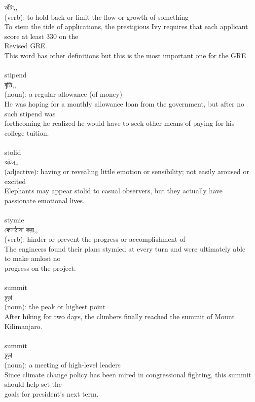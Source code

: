 \documentclass{article}
\begin{document}
{ডাঁটা,,}\\
{(verb): to hold back or limit the flow or growth of something\\To stem the tide of applications, the prestigious Ivy requires that each applicant score at least 330 on the\\Revised GRE.\\This word has other definitions but this is the most important one for the GRE\\}\\
{stipend}\\
{বৃত্তি,,}\\
{(noun): a regular allowance (of money)\\He was hoping for a monthly allowance loan from the government, but after no such stipend was\\forthcoming he realized he would have to seek other means of paying for his college tuition.\\}\\
{stolid}\\
{অটল,,}\\
{(adjective): having or revealing little emotion or sensibility; not easily aroused or excited\\Elephants may appear stolid to casual observers, but they actually have passionate emotional lives.\\}\\
{stymie}\\
{কোণঠাসা করা,,}\\
{(verb): hinder or prevent the progress or accomplishment of\\The engineers found their plans stymied at every turn and were ultimately able to make amlost no\\progress on the project.\\}\\
{summit}\\
{চূড়া}\\
{(noun): the peak or highest point\\After hiking for two days, the climbers finally reached the summit of Mount Kilimanjaro.\\}\\
{summit}\\
{চূড়া}\\
{(noun): a meeting of high-level leaders\\Since climate change policy has been mired in congressional fighting, this summit should help set the\\goals for president's next term.\\}\\
\end{document}
